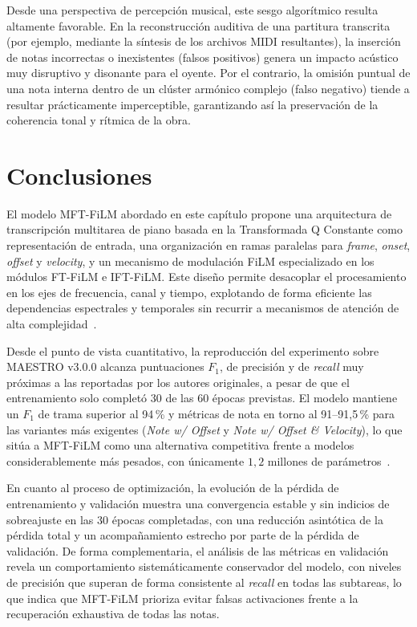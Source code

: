 \documentclass[11pt,spanish,listoffigures,listoftables]{tfgetsinf}
\begin{document}
Desde una perspectiva de percepción musical, este sesgo algorítmico resulta 
altamente favorable. En la reconstrucción auditiva de una partitura transcrita 
(por ejemplo, mediante la síntesis de los archivos MIDI resultantes), la 
inserción de notas incorrectas o inexistentes (falsos positivos) genera un 
impacto acústico muy disruptivo y disonante para el oyente. Por el contrario, 
la omisión puntual de una nota interna dentro de un clúster armónico complejo 
(falso negativo) tiende a resultar prácticamente imperceptible, garantizando 
así la preservación de la coherencia tonal y rítmica de la obra.

\section{Conclusiones}
\label{sec:mft_conclusiones}

El modelo MFT-FiLM abordado en este capítulo propone una arquitectura de transcripción multitarea de piano basada en la
Transformada Q Constante como representación de entrada, una organización en ramas paralelas para 
\textit{frame}, \textit{onset}, \textit{offset} y \textit{velocity}, y un mecanismo de modulación FiLM
especializado en los módulos FT-FiLM e IFT-FiLM. Este diseño permite desacoplar el procesamiento en los
ejes de frecuencia, canal y tiempo, explotando de forma eficiente las dependencias espectrales y temporales
sin recurrir a mecanismos de atención de alta complejidad~\cite{wang2025mftfilm}.

Desde el punto de vista cuantitativo, la reproducción del experimento sobre MAESTRO v3.0.0 alcanza puntuaciones
$F_1$, de precisión y de \textit{recall} muy próximas a las reportadas por los autores originales, a pesar 
de que el entrenamiento solo completó 30 de las 60 épocas previstas. El modelo mantiene un $F_1$ de trama 
superior al 94\,\% y métricas de nota en torno al 91--91{,}5\,\% para las variantes más 
exigentes (\textit{Note w/ Offset} y \textit{Note w/ Offset \& Velocity}), lo que sitúa a MFT-FiLM como 
una alternativa competitiva frente a modelos considerablemente más pesados, con únicamente 
$1{,}2$ millones de parámetros~\cite{wang2025mftfilm,yan2024transkun}.

En cuanto al proceso de optimización, la evolución de la pérdida de entrenamiento y validación muestra
una convergencia estable y sin indicios de sobreajuste en las 30 épocas completadas, con una reducción
asintótica de la pérdida total y un acompañamiento estrecho por parte de la pérdida de validación. De 
forma complementaria, el análisis de las métricas en validación revela un comportamiento sistemáticamente 
conservador del modelo, con niveles de precisión que superan de forma consistente al \textit{recall} en todas 
las subtareas, lo que indica que MFT-FiLM prioriza evitar falsas activaciones frente a la recuperación 
exhaustiva de todas las notas.
\end{document}
